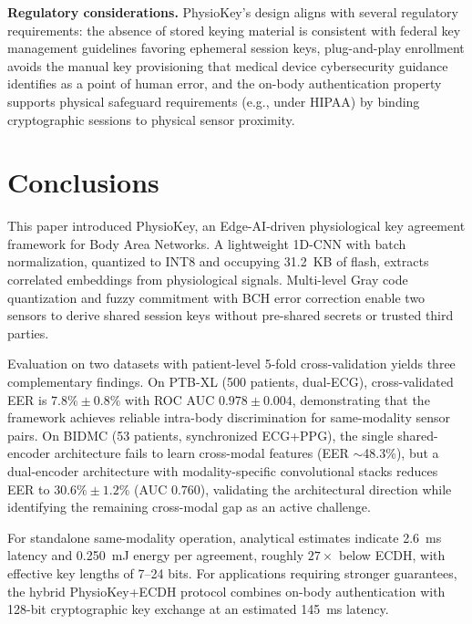 \documentclass[sensors,article,submit,pdftex,moreauthors]{Definitions/mdpi}
\begin{document}
\textbf{Regulatory considerations.} PhysioKey's design aligns with several regulatory requirements: the absence of stored keying material is consistent with federal key management guidelines favoring ephemeral session keys, plug-and-play enrollment avoids the manual key provisioning that medical device cybersecurity guidance identifies as a point of human error, and the on-body authentication property supports physical safeguard requirements (e.g., under HIPAA) by binding cryptographic sessions to physical sensor proximity.


\section{Conclusions}
\label{sec:conclusion}

This paper introduced PhysioKey, an Edge-AI-driven physiological key agreement framework for Body Area Networks. A lightweight 1D-CNN with batch normalization, quantized to INT8 and occupying 31.2~KB of flash, extracts correlated embeddings from physiological signals. Multi-level Gray code quantization and fuzzy commitment with BCH error correction enable two sensors to derive shared session keys without pre-shared secrets or trusted third parties.

Evaluation on two datasets with patient-level 5-fold cross-validation yields three complementary findings. On PTB-XL (500 patients, dual-ECG), cross-validated EER is $7.8\% \pm 0.8\%$ with ROC AUC $0.978 \pm 0.004$, demonstrating that the framework achieves reliable intra-body discrimination for same-modality sensor pairs. On BIDMC (53 patients, synchronized ECG+PPG), the single shared-encoder architecture fails to learn cross-modal features (EER $\sim$48.3\%), but a dual-encoder architecture with modality-specific convolutional stacks reduces EER to $30.6\% \pm 1.2\%$ (AUC $0.760$), validating the architectural direction while identifying the remaining cross-modal gap as an active challenge.

For standalone same-modality operation, analytical estimates indicate 2.6~ms latency and 0.250~mJ energy per agreement, roughly $27\times$ below ECDH, with effective key lengths of 7--24 bits. For applications requiring stronger guarantees, the hybrid PhysioKey+ECDH protocol combines on-body authentication with 128-bit cryptographic key exchange at an estimated 145~ms latency.
\end{document}
